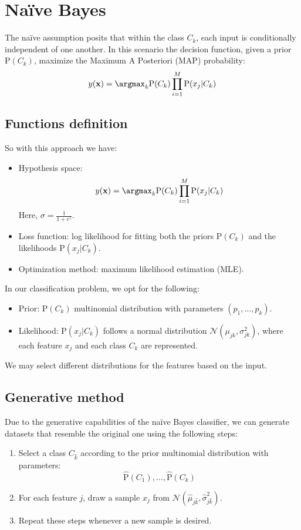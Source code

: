 \section{Naïve Bayes}

The naïve assumption posits that within the class $C_k$, each input is conditionally independent of one another.
In this scenario the decision function, given a prior $\text{P}(C_k)$, maximize the Maximum A Posteriori (MAP) probability:
\[y(\textbf{x})=\argmax_{k}\text{P}(C_k)\prod_{i=1}^{M}\text{P}(x_j|C_k)\]

\subsection{Functions definition}
So with this approach we have: 
\begin{itemize}
    \item Hypothesis space: 
    \[y(\textbf{x})=\argmax_{k}\text{P}(C_k)\prod_{i=1}^{M}\text{P}(x_j|C_k)\]
    Here, $\sigma=\frac{1}{1+e^{z}}$. 
    \item Loss function: log likelihood for fitting both the priors $\text{P}(C_k)$ and the likelihoods $\text{P}(x_j |C_k)$.
    \item Optimization method: maximum likelihood estimation (MLE).
\end{itemize}
In our classification problem, we opt for the following:
\begin{itemize}
    \item Prior: $\text{P}(C_k)$ multinomial distribution with parameters $(p_1, \dots , p_k)$. 
    \item Likelihood: $\text{P}(x_j|C_k)$ follows a normal distribution $\mathcal{N}(\mu_{jk},\sigma_{jk}^2)$, where each feature $x_j$ and each class $C_k$ are represented.
\end{itemize}
We may select different distributions for the features based on the input.

\subsection{Generative method}
Due to the generative capabilities of the naïve Bayes classifier, we can generate datasets that resemble the original one using the following steps:
\begin{enumerate}
    \item Select a class $C_{\hat{k}}$ according to the prior multinomial distribution with parameters: 
        \[\hat{\text{P}}(C_1),\dots,\hat{\text{P}}(C_k)\]
    \item For each feature $j$, draw a sample $x_j$ from $\mathcal{N}(\hat{\mu}_{j\hat{k}}, \hat{\sigma}_{j\hat{k}}^2)$. 
    \item Repeat these steps whenever a new sample is desired.
\end{enumerate}

